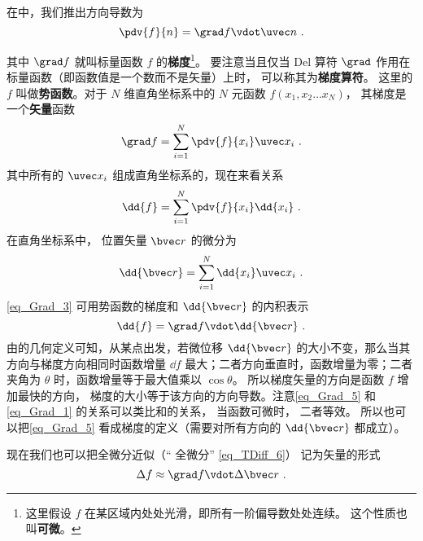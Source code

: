 

在中，我们推出方向导数为
\begin{equation}\label{eq_Grad_1}
\pdv{f}{n} = \grad f \vdot \uvec n~.
\end{equation}

其中 $\grad f$ 就叫标量函数 $f$ 的\textbf{梯度}\footnote{这里假设 $f$ 在某区域内处处光滑，即所有一阶偏导数处处连续。 这个性质也叫\textbf{可微}。}。 要注意当且仅当 Del 算符 $\grad$ 作用在标量函数（即函数值是一个数而不是矢量）上时， 可以称其为\textbf{梯度算符}。 这里的 $f$ 叫做\textbf{势函数}。对于 $N$ 维直角坐标系中的 $N$ 元函数 $f(x_1,x_2\dots x_N)$， 其梯度是一个\textbf{矢量}函数
\begin{equation}
\grad f = \sum_{i=1}^{N}\pdv{f}{x_i}\uvec x_i~.
\end{equation}
其中所有的 $\uvec x_i$ 组成直角坐标系的，现在来看关系
\begin{equation}\label{eq_Grad_3}
\dd{f} = \sum_{i = 1}^N \pdv{f}{x_i} \dd{x_i}~.
\end{equation}
在直角坐标系中， 位置矢量 $\bvec r$ 的微分为
\begin{equation}
\dd{\bvec r} = \sum_{i=1}^{N} \dd{x_i} \uvec x_i~.
\end{equation}
\autoref{eq_Grad_3} 可用势函数的梯度和 $\dd{\bvec r}$ 的内积表示
\begin{equation}\label{eq_Grad_5}
\dd{f} = \grad f \vdot \dd{\bvec r}~.
\end{equation}
由的几何定义可知，从某点出发，若微位移 $\dd{\bvec r}$ 的大小不变，那么当其方向与梯度方向相同时函数增量 $\dd{f}$ 最大；二者方向垂直时，函数增量为零；二者夹角为 $\theta$ 时，函数增量等于最大值乘以 $\cos \theta$。 所以梯度矢量的方向是函数 $f$ 增加最快的方向， 梯度的大小等于该方向的方向导数。注意\autoref{eq_Grad_5} 和\autoref{eq_Grad_1} 的关系可以类比和的关系， 当函数可微时， 二者等效。 所以也可以把\autoref{eq_Grad_5} 看成梯度的定义（需要对所有方向的 $\dd{\bvec r}$ 都成立）。

现在我们也可以把全微分近似（“ 全微分” \autoref{eq_TDiff_6}） 记为矢量的形式
\begin{equation}\label{eq_Grad_6}
\Delta f \approx \grad f \vdot \Delta \bvec r~.
\end{equation}


